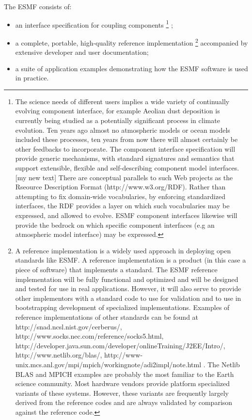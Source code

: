 \noindent The ESMF consists of:
\begin{itemize}
\item an interface specification for coupling components \footnote{
The science needs of different users
implies a wide variety of continually evolving component interface, for
example Aeolian dust deposition is currently being studied as a
potentially significant process in climate evolution. Ten years ago
almost no atmospheric models or ocean models included these processes,
ten years from now there will almost certainly be other feedbacks to
incorporate. The component interface specification will provide generic
mechanisms, with standard signatures and semantics that support
extensible, flexible and self-describing component model interfaces.
[my new text] There are conceptual parallels to such Web projects as the
Rseource Description Format (http://www.w3.org/RDF). Rather than
attempting to fix domain-wide vocabularies, by enforcing standardized
interfaces, the RDF provides a layer on which
such vocabularies may be expressed, and allowed to evolve. ESMF
component interfaces likewise will provide the bedrock on which specific
component interfaces (e.g an atmospheric model interface) may be expressed.
}
; 
\item a complete, portable, high-quality reference implementation
\footnote{
A reference implementation is a widely used approach in deploying open
standards like ESMF. A reference implementation is a product (in this
case a piece of software) that implements a standard. The ESMF reference 
implementation will be fully functional and optimized and will be designed and
tested for use in real applications. However, it will also serve to
provide other implementors with a standard code to use for validation 
and to use in bootstrapping development of specialized implementations.
Examples of reference implementations of other standards can be found
at http://snad.ncsl.nist.gov/cerberus/,
http://www.socks.nec.com/reference/socks5.html, http://developer.java.sun.com/developer/onlineTraining/J2EE/Intro/,
http://www.netlib.org/blas/, http://www-unix.mcs.anl.gov/mpi/mpich/workingnote/adi2impl/note.html . The Netlib BLAS and MPICH
examples are probably the most familiar to the Earth science community. Most hardware vendors provide platform specialized variants
of these systems. However, these variants are frequently largely derived from the reference codes and are always validated by
comparison against the reference code.
}
  accompanied by extensive developer and user documentation;
\item a suite of application examples demonstrating how the ESMF
  software is used in practice.
\end{itemize}

